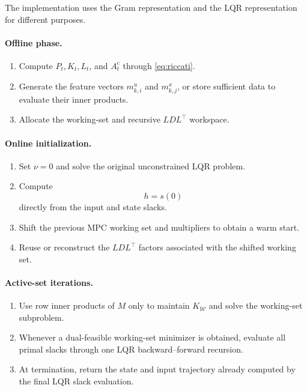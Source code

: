 \documentclass[11pt]{article}
\begin{document}
The implementation uses the Gram representation and the LQR
representation for different purposes.

\paragraph{Offline phase.}
\begin{enumerate}
\item Compute \(P_t,K_t,L_t\), and \(A_t^{\mathrm c}\) through
      \eqref{eq:riccati}.
\item Generate the feature vectors \(m_{k,i}^u\) and \(m_{k,j}^x\),
      or store sufficient data to evaluate their inner products.
\item Allocate the working-set and recursive \(LDL^\top\) workspace.
\end{enumerate}

\paragraph{Online initialization.}
\begin{enumerate}
\item Set \(\nu=0\) and solve the original unconstrained LQR problem.
\item Compute
      \[
      h=s(0)
      \]
      directly from the input and state slacks.
\item Shift the previous MPC working set and multipliers to obtain a
      warm start.
\item Reuse or reconstruct the \(LDL^\top\) factors associated with
      the shifted working set.
\end{enumerate}

\paragraph{Active-set iterations.}
\begin{enumerate}
\item Use row inner products of \(M\) only to maintain
      \(K_{\mathcal W}\) and solve the working-set subproblem.
\item Whenever a dual-feasible working-set minimizer is obtained,
      evaluate all primal slacks through one LQR backward--forward
      recursion.
\item At termination, return the state and input trajectory already
      computed by the final LQR slack evaluation.
\end{enumerate}
\end{document}

